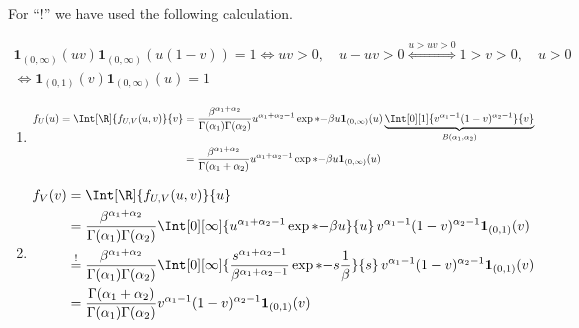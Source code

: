 \begin{solution}
For \enquote{$!$} we have used the following calculation.

\begin{multline*}
    \mathbf 1_{(0, \infty)}(u v) \mathbf 1_{(0, \infty)}(u (1 - v)) = 1
    \iff
    u v > 0, \quad u - u v > 0
    \stackrel
    {
        u > u v > 0
    }{\iff}
    1 > v > 0, \quad u > 0 \\
    \iff
    \mathbf 1_{(0, 1)}(v) \mathbf 1_{(0, \infty)}(u) = 1
\end{multline*}

\begin{enumerate}[label = (\alph*)]

    \item

    \begin{multline*}
        f_U(u)
        =
        \Int[\R]{f_{U, V}(u, v)}{v}
        =
        \frac{\beta^{\alpha_1 + \alpha_2}}{\Gamma(\alpha_1) \Gamma(\alpha_2)}
        u^{\alpha_1 + \alpha_2 - 1}
        \exp*{-\beta u}
        \mathbf 1_{(0, \infty)}(u)
        \underbrace
        {
            \Int[0][1]
            {
                v^{\alpha_1 - 1}
                (1 - v)^{\alpha_2 - 1}
            }{v}
        }_{
            B(\alpha_1, \alpha_2)
        } \\
        =
        \frac{\beta^{\alpha_1 + \alpha_2}}{\Gamma(\alpha_1 + \alpha_2)}
        u^{\alpha_1 + \alpha_2 - 1}
        \exp*{-\beta u}
        \mathbf 1_{(0, \infty)}(u)
    \end{multline*}

    \item

    \begin{align*}
        f_V(v)
        & =
        \Int[\R]{f_{U, V}(u, v)}{u} \\
        & =
        \frac{\beta^{\alpha_1 + \alpha_2}}{\Gamma(\alpha_1) \Gamma(\alpha_2)}
        \Int[0][\infty]
        {
            u^{\alpha_1 + \alpha_2 - 1}
            \exp*{-\beta u}
        }{u} \,
        v^{\alpha_1 - 1}
        (1 - v)^{\alpha_2 - 1}
        \mathbf 1_{(0, 1)}(v) \\
        & \stackrel{!}{=}
        \frac{\beta^{\alpha_1 + \alpha_2}}{\Gamma(\alpha_1) \Gamma(\alpha_2)}
        \Int[0][\infty]
        {
            \frac{s^{\alpha_1 + \alpha_2 - 1}}{\beta^{\alpha_1 + \alpha_2 - 1}}
            \exp*{-s}
            \frac{1}{\beta}
        }{s} \,
        v^{\alpha_1 - 1}
        (1 - v)^{\alpha_2 - 1}
        \mathbf 1_{(0, 1)}(v) \\
        & =
        \frac{\Gamma(\alpha_1 + \alpha_2)}{\Gamma(\alpha_1) \Gamma(\alpha_2)}
        v^{\alpha_1 - 1}
        (1 - v)^{\alpha_2 - 1}
        \mathbf 1_{(0, 1)}(v)
    \end{align*}


\end{enumerate}
\end{solution}
